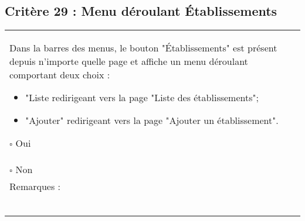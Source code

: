   		
  			\subsection*{Critère 29 : Menu déroulant Établissements}
	
	\begin{center}
    	 		\begin{tabular}[h]{|p{}|}
			\hline
				Dans la barres des menus, le bouton "Établissements" est présent depuis n'importe quelle page et affiche un menu déroulant comportant deux choix :   
				\begin{itemize}
					\item "Liste redirigeant vers la page "Liste des établissements";
					\item "Ajouter" redirigeant vers la page "Ajouter un établissement".
				\end{itemize}
				$\square$ Oui  \\ $\square$ Non \\\hline Remarques : \\ ~\\
			 \\\hline
     		\end{tabular}
  		\end{center}
  		
  		
  	